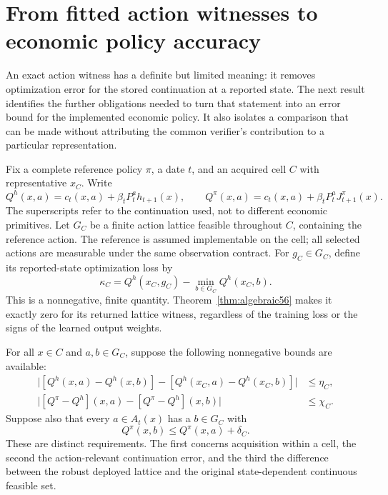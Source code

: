 \section{From fitted action witnesses to economic policy accuracy}\label{sec:action-transfer57}
An exact action witness has a definite but limited meaning: it removes optimization error for the stored continuation at a reported state. The next result identifies the further obligations needed to turn that statement into an error bound for the implemented economic policy. It also isolates a comparison that can be made without attributing the common verifier's contribution to a particular representation.

Fix a complete reference policy $\pi$, a date $t$, and an acquired cell $C$ with representative $x_C$. Write
\[
 Q^h(x,a)=c_t(x,a)+\beta_tP_t^ah_{t+1}(x),\qquad
 Q^\pi(x,a)=c_t(x,a)+\beta_tP_t^aJ_{t+1}^{\pi}(x).
\]
The superscripts refer to the continuation used, not to different economic primitives. Let $G_C$ be a finite action lattice feasible throughout $C$, containing the reference action. The reference is assumed implementable on the cell; all selected actions are measurable under the same observation contract. For $g_C\in G_C$, define its reported-state optimization loss by
\begin{equation}\label{eq:optimization-loss57}
 \kappa_C=Q^h(x_C,g_C)-\min_{b\in G_C}Q^h(x_C,b).
\end{equation}
This is a nonnegative, finite quantity. Theorem~\ref{thm:algebraic56} makes it exactly zero for its returned lattice witness, regardless of the training loss or the signs of the learned output weights.

For all $x\in C$ and $a,b\in G_C$, suppose the following nonnegative bounds are available:
\begin{align}
 \big|[Q^h(x,a)-Q^h(x,b)]-[Q^h(x_C,a)-Q^h(x_C,b)]\big|
       &\le\eta_C,\label{eq:spatial-contrast57}\\
 \big|[Q^\pi-Q^h](x,a)-[Q^\pi-Q^h](x,b)\big|
       &\le\chi_C.\label{eq:evaluation-contrast57}
\end{align}
Suppose also that every $a\in A_t(x)$ has a $b\in G_C$ with
\begin{equation}\label{eq:robust-cover57}
 Q^\pi(x,b)\le Q^\pi(x,a)+\delta_C.
\end{equation}
These are distinct requirements. The first concerns acquisition within a cell, the second the action-relevant continuation error, and the third the difference between the robust deployed lattice and the original state-dependent continuous feasible set.

